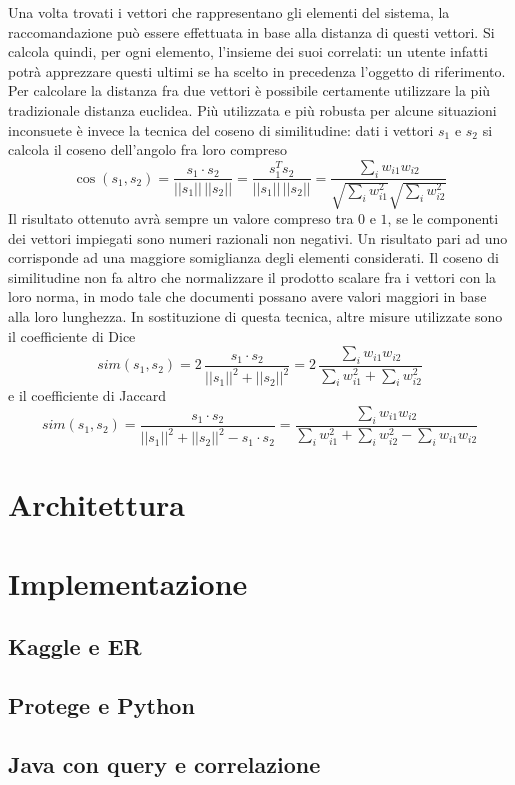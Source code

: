 \documentclass[Lau,binding=0.6cm,noexaminfo]{sapthesis}
\begin{document}
Una volta trovati i vettori che rappresentano gli elementi del sistema, la raccomandazione può essere effettuata in base alla distanza di questi vettori. Si calcola quindi, per ogni elemento, l'insieme dei suoi correlati: un utente infatti potrà apprezzare questi ultimi se ha scelto in precedenza l'oggetto di riferimento. Per calcolare la distanza fra due vettori è possibile certamente utilizzare la più tradizionale distanza euclidea. Più utilizzata e più robusta per alcune situazioni inconsuete è invece la tecnica del coseno di similitudine: dati i vettori $s_1$ e $s_2$ si calcola il coseno dell'angolo fra loro compreso
\[
\cos(s_1, s_2) = \frac{s_1 \cdot s_2}{||s_1|| \, ||s_2||} = \frac{s_1^T s_2}{||s_1|| \, ||s_2||} = \frac{\sum_{i} w_{i1} w_{i2}}{\sqrt{\sum_{i} w_{i1}^2} \sqrt{\sum_{i} w_{i2}^2}}
\]
Il risultato ottenuto avrà sempre un valore compreso tra $0$ e $1$, se le componenti dei vettori impiegati sono numeri razionali non negativi. Un risultato pari ad uno corrisponde ad una maggiore somiglianza degli elementi considerati. Il coseno di similitudine non fa altro che normalizzare il prodotto scalare fra i vettori con la loro norma, in modo tale che documenti possano avere valori maggiori in base alla loro lunghezza. In sostituzione di questa tecnica, altre misure utilizzate sono il coefficiente di Dice
\[
sim(s_1, s_2) = 2 \, \frac{s_1 \cdot s_2}{||s_1||^2 + ||s_2||^2} = 2 \, \frac{\sum_{i} w_{i1} w_{i2}}{\sum_{i} w_{i1}^2 + \sum_{i} w_{i2}^2}
\]
e il coefficiente di Jaccard
\[
sim(s_1, s_2) = \frac{s_1 \cdot s_2}{||s_1||^2 + ||s_2||^2 - s_1 \cdot s_2} = \frac{\sum_{i} w_{i1} w_{i2}}{\sum_{i} w_{i1}^2 + \sum_{i} w_{i2}^2 - \sum_{i} w_{i1} w_{i2}}
\]

\chapter{Architettura}

\chapter{Implementazione}
\section{Kaggle e ER}
\section{Protege e Python}
\section{Java con query e correlazione}
\end{document}
